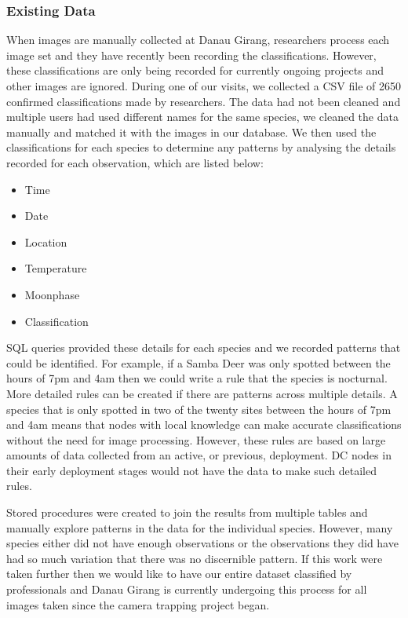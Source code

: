 			\subsubsection{Existing Data}
			When images are manually collected at Danau Girang, researchers process each image set and they have recently been recording the classifications. However, these classifications are only being recorded for currently ongoing projects and other images are ignored. During one of our visits, we collected a CSV file of 2650 confirmed classifications made by researchers. The data had not been cleaned and multiple users had used different names for the same species, we cleaned the data manually and matched it with the images in our database.
			We then used the classifications for each species to determine any patterns by analysing the details recorded for each observation, which are listed below:
			\begin{itemize}
				\item Time
				\item Date
				\item Location
				\item Temperature
				\item Moonphase
				\item Classification
			\end{itemize}
			
			SQL queries provided these details for each species and we recorded patterns that could be identified. For example, if a Samba Deer was only spotted between the hours of 7pm and 4am then we could write a rule that the species is nocturnal. More detailed rules can be created if there are patterns across multiple details. A species that is only spotted in two of the twenty sites between the hours of 7pm and 4am means that nodes with local knowledge can make accurate classifications without the need for image processing. However, these rules are based on large amounts of data collected from an active, or previous, deployment. DC nodes in their early deployment stages would not have the data to make such detailed rules.

			Stored procedures were created to join the results from multiple tables and manually explore patterns in the data for the individual species. However, many species either did not have enough observations or the observations they did have had so much variation that there was no discernible pattern. If this work were taken further then we would like to have our entire dataset classified by professionals and Danau Girang is currently undergoing this process for all images taken since the camera trapping project began.

